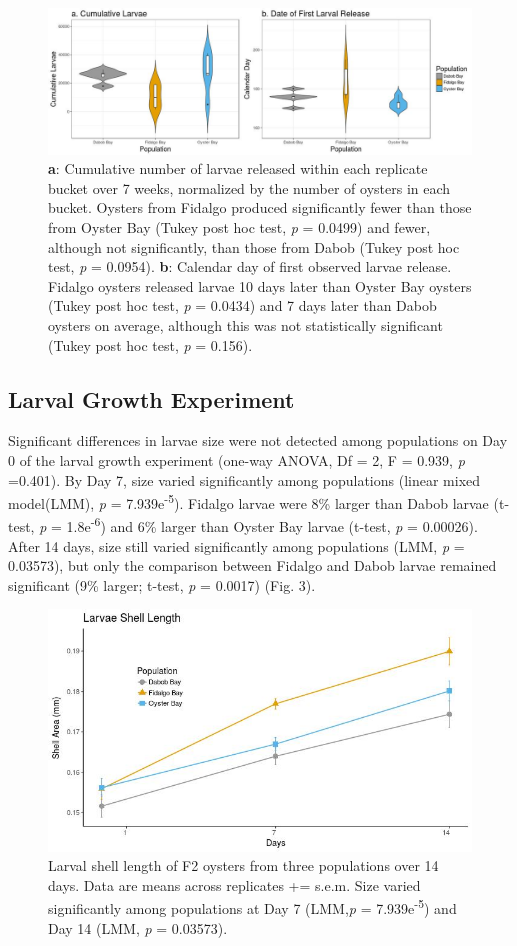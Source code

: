 \documentclass[fleqn,10pt]{wlscirep}
\begin{document}
\begin{figure}[H]
\centering
\includegraphics[width=0.8\linewidth]{Cum_1stDay_Comb_PS2015_color.jpeg}
\caption{\textbf{a}: Cumulative number of larvae released within each replicate bucket over 7 weeks, normalized by the number of oysters in each bucket. Oysters from Fidalgo produced significantly fewer than those from Oyster Bay (Tukey post hoc test, \textit{p} = 0.0499) and fewer, although not significantly, than those from Dabob (Tukey post hoc test, \textit{p} = 0.0954). \textbf{b}: Calendar day of first observed larvae release. Fidalgo oysters released larvae 10 days later than Oyster Bay oysters (Tukey post hoc test, \textit{p} = 0.0434) and 7 days later than Dabob oysters on average, although this was not statistically significant (Tukey post hoc test, \textit{p} = 0.156).}
\label{fig:Figure 2}
\end{figure}

\subsection*{Larval Growth Experiment}
Significant differences in larvae size were not detected among populations on Day 0 of the larval growth experiment (one-way ANOVA, Df = 2, F = 0.939, \textit{p} =0.401). By Day 7, size varied significantly among populations (linear mixed model(LMM), \textit{p} = 7.939e\textsuperscript{-5}). Fidalgo larvae were 8\% larger than Dabob larvae (t-test, \textit{p} = 1.8e\textsuperscript{-6}) and 6\% larger than Oyster Bay larvae (t-test, \textit{p} = 0.00026). After 14 days, size still varied significantly among populations (LMM, \textit{p} = 0.03573), but only the comparison between Fidalgo and Dabob larvae remained significant (9\% larger; t-test, \textit{p} = 0.0017) (Fig. 3).

\begin{figure}[H]
\centering
\includegraphics[width=0.7\linewidth]{Larvae_Length_Line_PS215_color.jpeg}
\caption{Larval shell length of F2 oysters from three populations over 14 days. Data are means across replicates += s.e.m. Size varied significantly among populations at Day 7 (LMM,\textit{p} = 7.939e\textsuperscript{-5}) and Day 14 (LMM, \textit{p} = 0.03573).}
\label{fig:Figure 3}
\end{figure}
\end{document}
